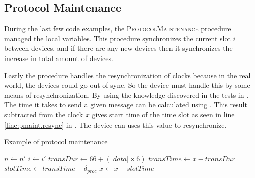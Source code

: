 \subsection{Protocol Maintenance}\label{subsec:protocolmaintanaince}
During the last few code examples, the \textsc{ProtocolMaintenance} procedure managed the local variables. 
This procedure synchronizes the current slot $i$ between devices, and if there are any new devices then it synchronizes the increase in total amount of devices.

Lastly the procedure handles the resynchronization of clocks because in the real world, the devices could go out of sync. 
So the  device must handle this by some means of resynchronization. 
By using the knowledge discovered in the tests in . 
The time it takes to send a given message can be calculated using . 
This result subtracted from the clock $x$ gives start time of the time slot as seen in line \ref{line:pmaint.resync} in . 
The device can uses this value to resynchronize.

\begin{algorithm}[h]
\caption{Example of protocol maintenance}
\label{lst:maintaniance}
\begin{algorithmic}[1]
        \State $n \gets n'$
    \EndIf
    \State $i \gets i'$
    \State $transDur \gets 66 + (|data| \times 6)$ 
    \State $transTime \gets x - transDur$ 
    \State $slotTime \gets transTime - \delta_{proc}$ 
    \State $x \gets x - slotTime$ \label{line:pmaint.resync}         
\EndProcedure        
\end{algorithmic}    
\end{algorithm} 
